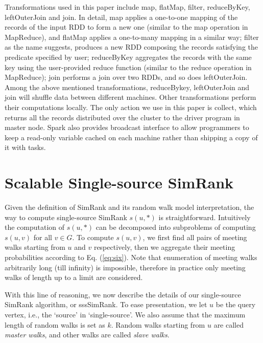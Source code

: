 \documentclass[conference]{IEEEtran}
\theoremstyle{definition}
\theoremstyle{definition}
\begin{document}
 Transformations used in this paper include {\asciifamily map}, {\asciifamily flatMap}, {\asciifamily filter},  {\asciifamily reduceByKey}, {\asciifamily leftOuterJoin} and {\asciifamily join}.
 In detail,  {\asciifamily map} applies a one-to-one mapping of the records of the input RDD to form a new one (similar to the {\asciifamily map} operation in MapReduce), and {\asciifamily flatMap} applies a one-to-many mapping in a similar way;
 {\asciifamily filter} as the name suggests, produces a new RDD composing the records satisfying the predicate specified by user;
{\asciifamily reduceByKey} aggregates the records with the same key using the user-provided reduce function (similar to the  {\asciifamily reduce}  operation  in  MapReduce);   {\asciifamily join} performs a join over two RDDs, and so does  {\asciifamily leftOuterJoin}.
Among the above mentioned transformations, {\asciifamily reduceBykey}, {\asciifamily leftOuterJoin} and {\asciifamily join} will shuffle data between different machines.
Other transformations perform their computations locally.
The only action we use in this paper is {\asciifamily collect}, which returns all the records distributed over the cluster to the driver program in master node.
Spark also provides {\asciifamily broadcast}  interface to allow programmers to keep a read-only variable cached on each machine rather than shipping a copy of it with tasks.


\section{Scalable Single-source SimRank}
Given the definition of SimRank and its random walk model interpretation, the way to compute single-source SimRank $s(u,*)$ is straightforward.
Intuitively the computation of $s(u,*)$ can be decomposed into subproblems of  computing $s(u,v)$ for all $v\in G$.
 To compute $s(u,v)$,  we first find all pairs of meeting walks starting from $u$ and $v$ respectively, then we aggregate their meeting probabilities according to Eq. (\ref{eq:six}). 
 Note that enumeration of meeting walks arbitrarily long (till  infinity) is impossible, therefore  in practice only meeting walks of length up to a limit are considered. 
 
With this line of reasoning, we now describe the details of our single-source SimRank algorithm, or sssSimRank.
To ease presentation, we let $u$ be the query vertex, i.e., the `source' in `single-source'.
We also assume that the maximum length of random walks is set as $k$. 
Random walks starting from $u$ are called {\em master walks}, and other walks are called {\em slave walks}.
\end{document}
